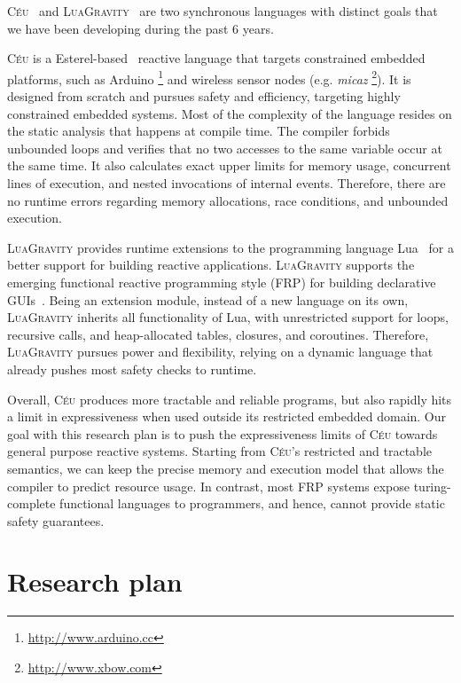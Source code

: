 \documentclass[pdftex,12pt,a4paper]{article}
\newcommand{\CEU}{\textsc{C\'{e}u}\xspace}
\newcommand{\GVT}{\textsc{LuaGravity}\xspace}
\begin{document}
\CEU~\cite{ceu.tr,ceu.phd,ceu.sensys13,ceu.rem13}
and
\GVT~\cite{luagravity.sblp,luagravity.msc}
are two synchronous languages with distinct goals that we have been developing 
during the past 6 years.

\CEU is a Esterel-based~\cite{esterel.ieee91} reactive language that targets 
constrained embedded platforms, such as Arduino%
\footnote{\url{http://www.arduino.cc}}
and wireless sensor nodes (e.g. \emph{micaz}%
\footnote{\url{http://www.xbow.com}}).
It is designed from scratch and pursues safety and efficiency, targeting highly 
constrained embedded systems.
Most of the complexity of the language resides on the static analysis that 
happens at compile time.
The compiler forbids unbounded loops and verifies that no two accesses to the 
same variable occur at the same time.
It also calculates exact upper limits for memory usage, concurrent lines of 
execution, and nested invocations of internal events.
Therefore, there are no runtime errors regarding memory allocations, race 
conditions, and unbounded execution.

\GVT provides runtime extensions to the programming language Lua~\cite{lua.pil} 
for a better support for building reactive applications.
\GVT supports the emerging functional reactive programming style (FRP) for 
building declarative GUIs~\cite{frp.flapjax,frp.elm,frp.survey}.
Being an extension module, instead of a new language on its own, \GVT inherits 
all functionality of Lua, with unrestricted support for loops, recursive calls, 
and heap-allocated tables, closures, and coroutines.
Therefore, \GVT pursues power and flexibility, relying on a dynamic language 
that already pushes most safety checks to runtime.

Overall, \CEU produces more tractable and reliable programs, but also rapidly 
hits a limit in expressiveness when used outside its restricted embedded 
domain.
%
Our goal with this research plan is to push the expressiveness limits of \CEU 
towards general purpose reactive systems.
%
Starting from \CEU's restricted and tractable semantics, we can keep the 
precise memory and execution model that allows the compiler to predict resource 
usage.
%
In contrast, most FRP systems expose turing-complete functional languages to 
programmers, and hence, cannot provide static safety guarantees.

\section{Research plan}
\end{document}
